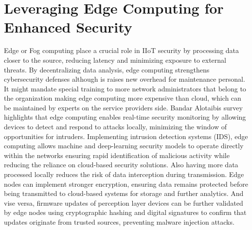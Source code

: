 \documentclass[article,a4paper]{IEEEtran}
\begin{document}
\section{Leveraging Edge Computing for Enhanced Security}
Edge or Fog computing place a crucial role in IIoT security by processing data closer to the source, reducing latency and minimizing exposure to external threats. By decentralizing data analysis, edge computing strengthens cybersecurity defenses although is raises new overhead for maintenance personal. It might mandate special training to more network administrators that belong to the organization making edge computing more expensive than cloud, which can be maintained by experts on the service providers side.
\newline\newline 
Bandar Alotaibis survey \cite{SurveySecurity} highlights that edge computing enables real-time security monitoring by allowing devices to detect and respond to attacks locally, minimizing the window of opportunities for intruders. Implementing intrusion detection systems (IDS), edge computing allows machine and deep-learning security models to operate directly within the networks ensuring rapid identification of malicious activity while reducing the reliance on cloud-based security solutions. 
\newline
Also having more data processed locally reduces the risk of data interception during transmission. Edge nodes can implement stronger encryption, ensuring data remains protected before being transmitted to cloud-based systems for storage and further analytics. And vise versa, firmware updates of perception layer devices can be further validated by edge nodes using cryptographic hashing and digital signatures to confirm that updates originate from trusted sources, preventing malware injection attacks. 
\end{document}
